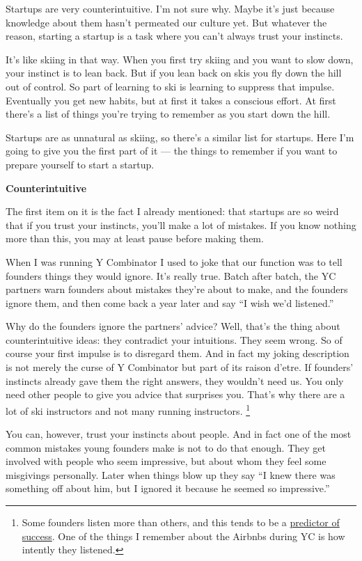 \documentclass[12pt]{book}
\begin{document}
Startups are very counterintuitive. I'm not sure why. Maybe it's just
because knowledge about them hasn't permeated our culture yet. But
whatever the reason, starting a startup is a task where you can't always
trust your instincts.

It's like skiing in that way. When you first try skiing and you want to
slow down, your instinct is to lean back. But if you lean back on skis
you fly down the hill out of control. So part of learning to ski is
learning to suppress that impulse. Eventually you get new habits, but at
first it takes a conscious effort. At first there's a list of things
you're trying to remember as you start down the hill.

Startups are as unnatural as skiing, so there's a similar list for
startups. Here I'm going to give you the first part of it --- the things
to remember if you want to prepare yourself to start a startup.

\textbf{Counterintuitive}

The first item on it is the fact I already mentioned: that startups are
so weird that if you trust your instincts, you'll make a lot of
mistakes. If you know nothing more than this, you may at least pause
before making them.

When I was running Y Combinator I used to joke that our function was to
tell founders things they would ignore. It's really true. Batch after
batch, the YC partners warn founders about mistakes they're about to
make, and the founders ignore them, and then come back a year later and
say ``I wish we'd listened.''

Why do the founders ignore the partners' advice? Well, that's the thing
about counterintuitive ideas: they contradict your intuitions. They seem
wrong. So of course your first impulse is to disregard them. And in fact
my joking description is not merely the curse of Y Combinator but part
of its raison d'etre. If founders' instincts already gave them the right
answers, they wouldn't need us. You only need other people to give you
advice that surprises you. That's why there are a lot of ski instructors
and not many running instructors. \footnote{Some founders listen more than others, and this tends to be a
\href{word.html}{predictor of success}. One of the things I remember
about the Airbnbs during YC is how intently they listened.}

You can, however, trust your instincts about people. And in fact one of
the most common mistakes young founders make is not to do that enough.
They get involved with people who seem impressive, but about whom they
feel some misgivings personally. Later when things blow up they say ``I
knew there was something off about him, but I ignored it because he
seemed so impressive.''
\end{document}

